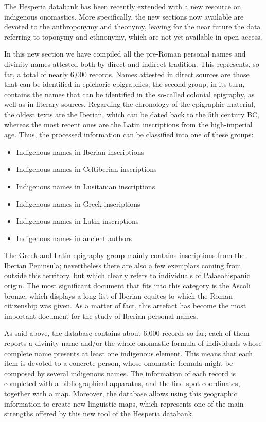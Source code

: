 \documentclass[amsthm,ebook]{saparticle}
\begin{document}
\noindent The Hesperia databank has been recently extended with a new resource on indigenous onomastics. More specifically, the
new sections now available are devoted to the anthroponymy and theonymy, leaving for the near future the data referring
to toponymy and ethnonymy, which are not yet available in open access.

In this new section we have compiled all the pre-Roman personal names and divinity names attested both by direct and
indirect tradition. This represents, so far, a total of nearly 6,000 records. Names attested in direct sources are
those that can be identified in epichoric epigraphies; the second group, in its turn, contains the names that can be
identified in the so-called colonial epigraphy, as well as in literary sources. Regarding the chronology of the
epigraphic material, the oldest texts are the Iberian, which can be dated back to the 5th century BC, whereas the most
recent ones are the Latin inscriptions from the high-imperial age. Thus, the processed information can be classified
into one of these groups:

\begin{itemize}
\item Indigenous names in Iberian inscriptions
\item Indigenous names in Celtiberian inscriptions 
\item Indigenous names in Lusitanian inscriptions
\item Indigenous names in Greek inscriptions
\item Indigenous names in Latin inscriptions
\item Indigenous names in ancient authors
\end{itemize}
The Greek and Latin epigraphy group mainly contains inscriptions from the Iberian Peninsula; nevertheless there are also
a few exemplars coming from outside this territory, but which clearly refers to individuals of Palaeohispanic origin.
The most significant document that fits into this category is the Ascoli bronze, which displays a long list of Iberian
equites to which the Roman citizenship was given. As a matter of fact, this artefact has become the most important
document for the study of Iberian personal names.

As said above, the database contains about 6,000 records so far; each of them reports a divinity name and/or the whole
onomastic formula of individuals whose complete name presents at least one indigenous element. This means that each
item is devoted to a concrete person, whose onomastic formula might be composed by several indigenous names. The
information of each record is completed with a bibliographical apparatus, and the find-spot coordinates, together with
a map. Moreover, the database allows using this geographic information to create new linguistic maps, which represents
one of the main strengths offered by this new tool of the Hesperia databank.
\end{document}
